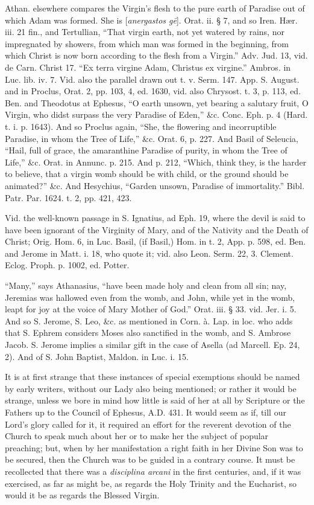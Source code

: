 Athan. elsewhere compares the Virgin's flesh to
the pure earth of Paradise out of which Adam was formed. She is [\emph{anergastos
g\={e}}]. Orat. ii. § 7, and so Iren. Hær. iii. 21 fin., and
Tertullian, ``That virgin earth, not yet watered by rains, nor
impregnated by showers, from which man was formed in the beginning,
from which Christ is now born according to the flesh from a Virgin.''
Adv. Jud. 13, vid. de Carn. Christ 17. ``Ex terra virgine Adam,
Christus ex virgine.'' Ambros. in Luc. lib. iv. 7. Vid. also the
parallel drawn out t. v. Serm. 147. App. S. August. and in Proclus,
Orat. 2, pp. 103, 4, ed. 1630, vid. also Chrysost. t. 3, p. 113, ed.
Ben. and Theodotus at Ephesus, ``O earth unsown, yet bearing a salutary
fruit, O Virgin, who didst surpass the very Paradise of Eden,'' \&c.
Conc. Eph. p. 4 (Hard. t. i. p. 1643). And so Proclus again, ``She, the
flowering and incorruptible Paradise, in whom the Tree of Life,''
\&c. Orat. 6, p. 227. And Basil of Seleucia, ``Hail, full of grace,
the amaranthine Paradise of purity, in whom the Tree of Life,'' \&c.
Orat. in Annunc. p. 215. And p. 212, ``Which, think they, is the harder
to believe, that a virgin womb should be with child, or the ground
should be animated?'' \&c. And Hesychius, ``Garden unsown,
Paradise of immortality.'' Bibl. Patr. Par. 1624. t. 2, pp. 421, 423.

Vid. the well-known passage in S. Ignatius, ad
Eph. 19, where the devil is said to have been ignorant of the
Virginity of Mary, and of the Nativity and the Death of Christ; Orig.
Hom. 6, in Luc. Basil, (if Basil,) Hom. in t. 2, App. p. 598, ed. Ben.
and Jerome in Matt. i. 18, who quote it; vid. also Leon. Serm. 22, 3.
Clement. Eclog. Proph. p. 1002, ed. Potter.

``Many,'' says Athanasius, ``have been made holy and
clean from all sin; nay, Jeremias was hallowed even from the womb, and
John, while yet in the womb, leapt for joy at the voice of Mary Mother
of God.'' Orat. iii. § 33. vid. Jer. i. 5. And so S. Jerome, S. Leo,
\&c. as mentioned in Corn. à. Lap. in loc. who adds that S. Ephrem
considers Moses also sanctified in the womb, and S. Ambrose Jacob. S.
Jerome implies a similar gift in the case of Asella (ad Marcell. Ep.
24, 2). And of S. John Baptist, Maldon. in Luc. i. 15.

It is at first strange that these instances of
special exemptions should be named by early writers, without our Lady
also being mentioned; or rather it would be strange, unless we bore in
mind how little is said of her at all by Scripture or the
Fathers up to the Council of Ephesus, A.D.
431. It would seem as if, till our Lord's glory called for it, it
required an effort for the reverent devotion of the Church to speak
much about her or to make her the subject of popular preaching; but,
when by her manifestation a right faith in her Divine Son was to be
secured, then the Church was to be guided in a contrary course. It
must be recollected that there was a \emph{disciplina arcani} in the
first centuries, and, if it was exercised, as far as might be, as
regards the Holy Trinity and the Eucharist, so would it be as regards
the Blessed Virgin.

